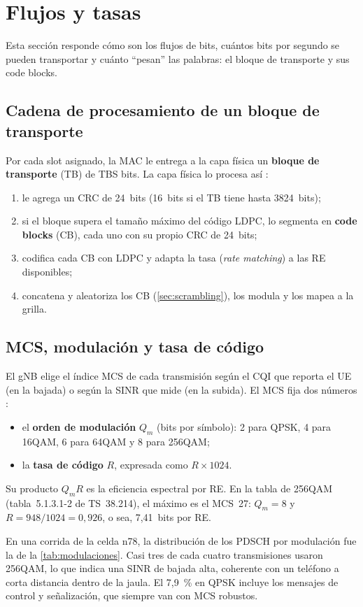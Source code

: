 \section{Flujos y tasas}\label{sec:flujos}

Esta sección responde cómo son los flujos de bits, cuántos bits por segundo se pueden transportar y cuánto ``pesan'' las palabras: el bloque de transporte y sus code blocks.

\subsection{Cadena de procesamiento de un bloque de transporte}
Por cada slot asignado, la MAC le entrega a la capa física un \textbf{bloque de transporte} (TB) de TBS bits. La capa física lo procesa así \cite{ts38212}:
\begin{enumerate}
  \item le agrega un CRC de 24~bits (16~bits si el TB tiene hasta 3824~bits);
  \item si el bloque supera el tamaño máximo del código LDPC, lo segmenta en \textbf{code blocks} (CB), cada uno con su propio CRC de 24~bits;
  \item codifica cada CB con LDPC y adapta la tasa (\emph{rate matching}) a las RE disponibles;
  \item concatena y aleatoriza los CB (\cref{sec:scrambling}), los modula y los mapea a la grilla.
\end{enumerate}

\subsection{MCS, modulación y tasa de código}
El gNB elige el índice MCS de cada transmisión según el CQI que reporta el UE (en la bajada) o según la SINR que mide (en la subida). El MCS fija dos números \cite[§5.1.3.1]{ts38214}:
\begin{itemize}
  \item el \textbf{orden de modulación} $Q_m$ (bits por símbolo): 2 para QPSK, 4 para 16QAM, 6 para 64QAM y 8 para 256QAM;
  \item la \textbf{tasa de código} $R$, expresada como $R\times 1024$.
\end{itemize}
Su producto $Q_m R$ es la eficiencia espectral por RE. En la tabla de 256QAM (tabla~5.1.3.1-2 de TS~38.214), el máximo es el MCS~27: $Q_m=8$ y $R = 948/1024 = 0{,}926$, o sea, 7,41~bits por RE.

En una corrida de la celda n78, la distribución de los PDSCH por modulación fue la de la \cref{tab:modulaciones}. Casi tres de cada cuatro transmisiones usaron 256QAM, lo que indica una SINR de bajada alta, coherente con un teléfono a corta distancia dentro de la jaula. El 7,9~\% en QPSK incluye los mensajes de control y señalización, que siempre van con MCS robustos.

